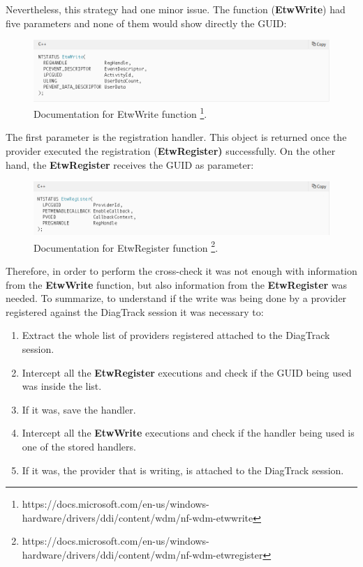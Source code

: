 Nevertheless, this strategy had one minor issue. The function ({\bfseries EtwWrite}) had five parameters and none of them would show directly the GUID:

\begin{figure}[H]
  \includegraphics[width=\linewidth]{images/etw_write_docu.png}
  \caption[]{Documentation for EtwWrite function \footnote{https://docs.microsoft.com/en-us/windows-hardware/drivers/ddi/content/wdm/nf-wdm-etwwrite}. }
  \label{fig:etw_write_docu}
\end{figure}

The first parameter is the registration handler. This object is returned once the provider executed the registration ({\bfseries EtwRegister)} successfully.
On the other hand, the {\bfseries EtwRegister} receives the GUID as parameter:
\begin{figure}[H]
  \includegraphics[width=\linewidth]{images/etw_register_docu.png}
  \caption[]{Documentation for EtwRegister function \footnote{https://docs.microsoft.com/en-us/windows-hardware/drivers/ddi/content/wdm/nf-wdm-etwregister}.}
  \label{fig:etw_register_docu}
\end{figure}

Therefore, in order to perform the cross-check it was not enough with information from the {\bfseries EtwWrite} function, but also information from the {\bfseries EtwRegister} was needed. To summarize, to understand if the write was being done by a provider registered against the DiagTrack session it was necessary to: 
\begin{enumerate}
    \item Extract the whole list of providers registered attached to the DiagTrack session.
    \item Intercept all the {\bfseries EtwRegister} executions and check if the GUID being used was inside the list.
    \item If it was, save the handler. 
    \item Intercept all the {\bfseries EtwWrite} executions and check if the handler being used is one of the stored handlers.
    \item If it was, the provider that is writing, is attached to the DiagTrack session.
\end{enumerate}

